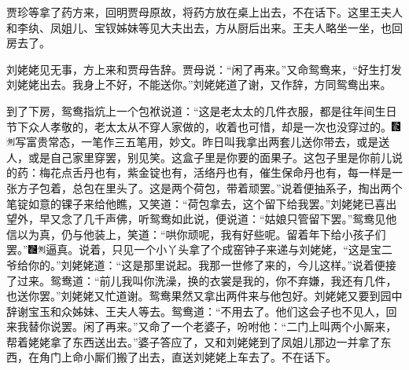 贾珍等拿了药方来，回明贾母原故，将药方放在桌上出去，不在话下。这里王夫人和李纨、凤姐儿、宝钗姊妹等见大夫出去，方从厨后出来。王夫人略坐一坐，也回房去了。

刘姥姥见无事，方上来和贾母告辞。贾母说：``闲了再来。''又命鸳鸯来，``好生打发刘姥姥出去。我身上不好，不能送你。''刘姥姥道了谢，又作辞，方同鸳鸯出来。

到了下房，鸳鸯指炕上一个包袱说道：``这是老太太的几件衣服，都是往年间生日节下众人孝敬的，老太太从不穿人家做的，收着也可惜，却是一次也没穿过的。{\includegraphics[width=3mm]{../Images/00006}\includegraphics[width=3mm]{../Images/00011}\footnotesize \kaishu 写富贵常态，一笔作三五笔用，妙文。}昨日叫我拿出两套儿送你带去，或是送人，或是自己家里穿罢，别见笑。这盒子里是你要的面果子。这包子里是你前儿说的药：梅花点舌丹也有，紫金锭也有，活络丹也有，催生保命丹也有，每一样是一张方子包着，总包在里头了。这是两个荷包，带着顽罢。''说着便抽系子，掏出两个笔锭如意的锞子来给他瞧，又笑道：``荷包拿去，这个留下给我罢。''刘姥姥已喜出望外，早又念了几千声佛，听鸳鸯如此说，便说道：``姑娘只管留下罢。''鸳鸯见他信以为真，仍与他装上，笑道：``哄你顽呢，我有好些呢。留着年下给小孩子们罢。''{\includegraphics[width=3mm]{../Images/00006}\includegraphics[width=3mm]{../Images/00011}\footnotesize \kaishu 逼真。}说着，只见一个小丫头拿了个成窑钟子来递与刘姥姥，``这是宝二爷给你的。''刘姥姥道：``这是那里说起。我那一世修了来的，今儿这样。''说着便接了过来。鸳鸯道：``前儿我叫你洗澡，换的衣裳是我的，你不弃嫌，我还有几件，也送你罢。''刘姥姥又忙道谢。鸳鸯果然又拿出两件来与他包好。刘姥姥又要到园中辞谢宝玉和众姊妹、王夫人等去。鸳鸯道：``不用去了。他们这会子也不见人，回来我替你说罢。闲了再来。''又命了一个老婆子，吩咐他：``二门上叫两个小厮来，帮着姥姥拿了东西送出去。''婆子答应了，又和刘姥姥到了凤姐儿那边一并拿了东西，在角门上命小厮们搬了出去，直送刘姥姥上车去了。不在话下。

